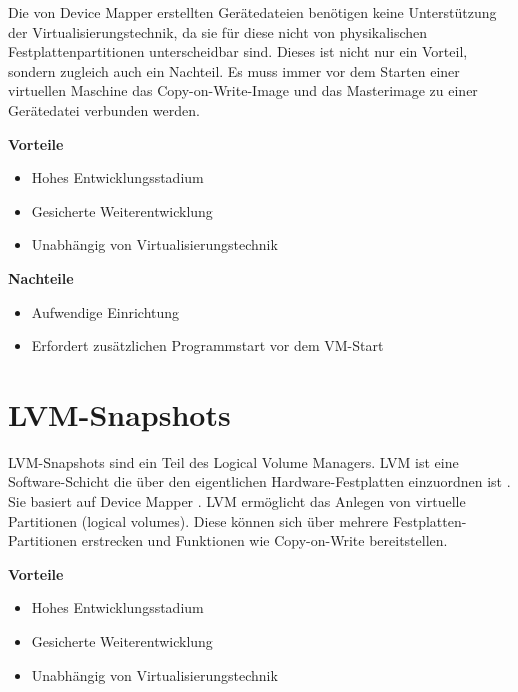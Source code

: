 Die von Device Mapper erstellten Gerätedateien benötigen keine Unterstützung der Virtualisierungstechnik, da sie für diese nicht von physikalischen Festplattenpartitionen unterscheidbar sind. Dieses ist nicht nur ein Vorteil, sondern zugleich auch ein Nachteil. Es muss immer vor dem Starten einer virtuellen Maschine das Copy-on-Write-Image und das Masterimage zu einer Gerätedatei verbunden werden.  

\textbf{Vorteile}
\begin{itemize}
 \item Hohes Entwicklungsstadium
 \item Gesicherte Weiterentwicklung
 \item Unabhängig von Virtualisierungstechnik
\end{itemize}

\textbf{Nachteile}
\begin{itemize}
 \item Aufwendige Einrichtung
 \item Erfordert zusätzlichen Programmstart vor dem VM-Start
\end{itemize}

\section{LVM-Snapshots}
LVM-Snapshots sind ein Teil des Logical Volume Managers. LVM ist eine Software-Schicht die über den eigentlichen Hardware-Festplatten einzuordnen ist \cite{lvmselflinux} \cite{Lvmhowto}. Sie basiert auf Device Mapper \cite{Lvmsource}. LVM ermöglicht das Anlegen von virtuelle Partitionen (logical volumes). Diese können sich über mehrere Festplatten-Partitionen erstrecken und Funktionen wie Copy-on-Write bereitstellen.

\textbf{Vorteile}
\begin{itemize}
 \item Hohes Entwicklungsstadium
 \item Gesicherte Weiterentwicklung
 \item Unabhängig von Virtualisierungstechnik
\end{itemize}

